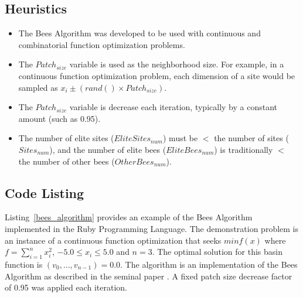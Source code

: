 \subsection{Heuristics}
\begin{itemize}
	\item The Bees Algorithm was developed to be used with continuous and combinatorial function optimization problems.
	\item The $Patch_{size}$ variable is used as the neighborhood size. For example, in a continuous function optimization problem, each dimension of a site would be sampled as $x_i \pm (rand() \times Patch_{size})$.
	\item The $Patch_{size}$ variable is decrease each iteration, typically by a constant amount (such as 0.95).
	\item The number of elite sites ($EliteSites_{num}$) must be $<$ the number of sites ($Sites_{num}$), and the number of elite bees ($EliteBees_{num}$) is traditionally $<$ the number of other bees ($OtherBees_{num}$).
\end{itemize}

\subsection{Code Listing}
Listing~\ref{bees_algorithm} provides an example of the Bees Algorithm implemented in the Ruby Programming Language. 
The demonstration problem is an instance of a continuous function optimization that seeks $min f(x)$ where $f=\sum_{i=1}^n x_{i}^2$, $-5.0\leq x_i \leq 5.0$ and $n=3$. The optimal solution for this basin function is $(v_0,\ldots,v_{n-1})=0.0$.
The algorithm is an implementation of the Bees Algorithm as described in the seminal paper \cite{Pham2006}. A fixed patch size decrease factor of 0.95 was applied each iteration.

